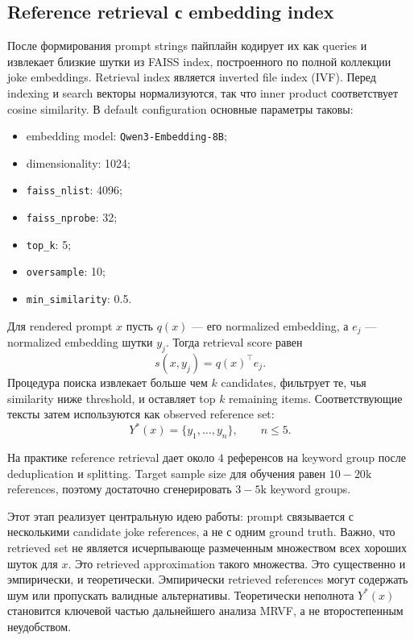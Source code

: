 \subsection{Reference retrieval с embedding index}

После формирования prompt strings пайплайн кодирует их как queries и извлекает близкие шутки из FAISS index, построенного по полной коллекции joke embeddings. Retrieval index является inverted file index (IVF). Перед indexing и search векторы нормализуются, так что inner product соответствует cosine similarity. В default configuration основные параметры таковы:
\begin{itemize}
    \item embedding model: \texttt{Qwen3-Embedding-8B};
    \item dimensionality: 1024;
    \item \texttt{faiss\_nlist}: 4096;
    \item \texttt{faiss\_nprobe}: 32;
    \item \texttt{top\_k}: 5;
    \item \texttt{oversample}: 10;
    \item \texttt{min\_similarity}: 0.5.
\end{itemize}

Для rendered prompt \(x\) пусть \(q(x)\) --- его normalized embedding, а \(e_j\) --- normalized embedding шутки \(y_j\). Тогда retrieval score равен
\[
    s(x,y_j)=q(x)^\top e_j.
\]
Процедура поиска извлекает больше чем \(k\) candidates, фильтрует те, чья similarity ниже threshold, и оставляет top \(k\) remaining items. Соответствующие тексты затем используются как observed reference set:
\[
    Y^{*}(x)=\{y_1,\dots,y_n\}, \qquad n \le 5.
\]

На практике reference retrieval дает около \(4\) референсов на keyword group после deduplication и splitting. Target sample size для обучения равен \(10-20\text{k}\) references, поэтому достаточно сгенерировать \(3-5\text{k}\) keyword groups.

Этот этап реализует центральную идею работы: prompt связывается с несколькими candidate joke references, а не с одним ground truth. Важно, что retrieved set не является исчерпывающе размеченным множеством всех хороших шуток для \(x\). Это retrieved approximation такого множества. Это существенно и эмпирически, и теоретически. Эмпирически retrieved references могут содержать шум или пропускать валидные альтернативы. Теоретически неполнота \(Y^{*}(x)\) становится ключевой частью дальнейшего анализа MRVF, а не второстепенным неудобством.

